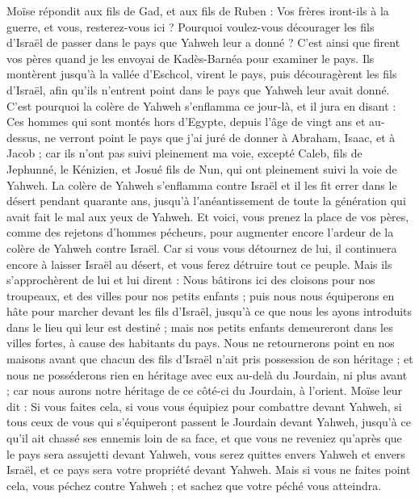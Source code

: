 \begin{multicols}{2}
Moïse répondit aux fils de Gad, et aux fils de Ruben : Vos frères iront-ils à la guerre, et vous, resterez-vous ici ?
Pourquoi voulez-vous décourager les fils d'Israël de passer dans le pays que Yahweh leur a donné ?
C'est ainsi que firent vos pères quand je les envoyai de Kadès-Barnéa pour examiner le pays.
Ils montèrent jusqu'à la vallée d'Eschcol, virent le pays, puis découragèrent les fils d'Israël, afin qu'ils n'entrent point dans le pays que Yahweh leur avait donné.
C'est pourquoi la colère de Yahweh s'enflamma ce jour-là, et il jura en disant :
Ces hommes qui sont montés hors d'Egypte, depuis l'âge de vingt ans et au-dessus, ne verront point le pays que j'ai juré de donner à Abraham, Isaac, et à Jacob ; car ils n'ont pas suivi pleinement ma voie,
excepté Caleb, fils de Jephunné, le Kénizien, et Josué fils de Nun, qui ont pleinement suivi la voie de Yahweh.
La colère de Yahweh s'enflamma contre Israël et il les fit errer dans le désert pendant quarante ans, jusqu’à l’anéantissement de toute la génération qui avait fait le mal aux yeux de Yahweh.
Et voici, vous prenez la place de vos pères, comme des rejetons d'hommes pécheurs, pour augmenter encore l'ardeur de la colère de Yahweh contre Israël.
Car si vous vous détournez de lui, il continuera encore à laisser Israël au désert, et vous ferez détruire tout ce peuple.
Mais ils s'approchèrent de lui et lui dirent : Nous bâtirons ici des cloisons pour nos troupeaux, et des villes pour nos petits enfants ;
puis nous nous équiperons en hâte pour marcher devant les fils d'Israël, jusqu'à ce que nous les ayons introduits dans le lieu qui leur est destiné ; mais nos petits enfants demeureront dans les villes fortes, à cause des habitants du pays.
Nous ne retournerons point en nos maisons avant que chacun des fils d'Israël n'ait pris possession de son héritage ;
et nous ne posséderons rien en héritage avec eux au-delà du Jourdain, ni plus avant ; car nous aurons notre héritage de ce côté-ci du Jourdain, à l'orient.
Moïse leur dit : Si vous faites cela, si vous vous équipiez pour combattre devant Yahweh,
si tous ceux de vous qui s’équiperont passent le Jourdain devant Yahweh, jusqu'à ce qu'il ait chassé ses ennemis loin de sa face,
et que vous ne reveniez qu'après que le pays sera assujetti devant Yahweh, vous serez quittes envers Yahweh et envers Israël, et ce pays sera votre propriété devant Yahweh.
Mais si vous ne faites point cela, vous péchez contre Yahweh ; et sachez que votre péché vous atteindra.

\end{multicols}
